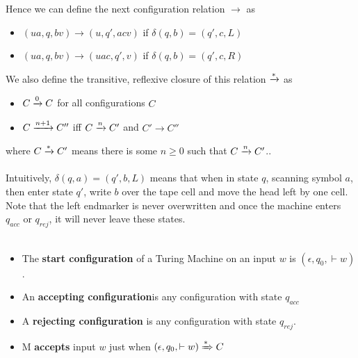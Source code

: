 \documentclass{article}
\newcommand{\Trans}[3]{ #1 \xrightarrow{ #2 }\mathrel{\vphantom{\to}} #3 }
\newcommand{\dTrans}[3]{ #1 \xRightarrow{ #2 }\mathrel{\vphantom{\to}} #3 }
\begin{document}
    Hence we can define the next configuration relation $\to$ as 
    \begin{itemize}
        \item $(ua, q, bv) \to (u, q', acv)$ if $\delta(q, b) = (q',c,L)$
        \item $(ua, q, bv) \to (uac, q', v)$ if $\delta(q, b) = (q',c, R)$
    \end{itemize}
    We also define the transitive, reflexive closure of this relation $\Trans{}{*}{}$ as
    \begin{itemize}
        \item $\Trans{C}{0}{C} $ for all configurations $C$
        \item $\Trans{C}{n+1}{C''}$ iff $\Trans{C}{n}{C'}$ and $C' \to C''$
    \end{itemize}
    where $\Trans{C}{*}{C'}$ means there is some $n \geq 0$ such that $\Trans{C}{n}{C'}$.. \\ \\
    Intuitively, $\delta(q, a) = (q', b, L)$ means that when in state $q$, scanning symbol $a$, then enter state $q'$, write $b$ over the tape cell and move the head left by one cell. Note that the left endmarker is never overwritten and once the machine enters $q_{acc}$ or $q_{rej}$, it will never leave these states. \\ \\
    \begin{itemize}
        \item The \textbf{start configuration} of a Turing Machine on an input $w$ is $(\epsilon, q_0, \vdash w)$.
        \item An \textbf{accepting configuration}is any configuration with state $q_{acc}$
        \item A \textbf{rejecting configuration} is any configuration with state $q_{rej}$. 
        \item M \textbf{accepts} input $w$ just when $\dTrans{(\epsilon, q_0, \vdash w)}{*}{C}$
    \end{itemize}
\end{document}
